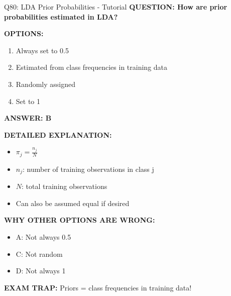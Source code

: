\documentclass[8pt]{beamer}
\begin{document}
	\begin{frame}{Q80: LDA Prior Probabilities - Tutorial}
		\fontsize{6.5}{7.5}\selectfont
		\textbf{QUESTION: How are prior probabilities estimated in LDA?}
		
		\vspace{0.1cm}
		\textbf{OPTIONS:}
		\begin{enumerate}
			\item Always set to 0.5
			\item Estimated from class frequencies in training data
			\item Randomly assigned
			\item Set to 1
		\end{enumerate}
		
		\vspace{0.1cm}
		\textcolor{myblue}{\textbf{ANSWER: B}}
		
		\vspace{0.1cm}
		\textbf{DETAILED EXPLANATION:}
		\begin{itemize}
			\item $\pi_j = \frac{n_j}{N}$
			\item $n_j$: number of training observations in class j
			\item $N$: total training observations
			\item Can also be assumed equal if desired
		\end{itemize}
		
		\vspace{0.1cm}
		\textcolor{myred}{\textbf{WHY OTHER OPTIONS ARE WRONG:}}
		\begin{itemize}
			\item \textcolor{myred}{A:} Not always 0.5
			\item \textcolor{myred}{C:} Not random
			\item \textcolor{myred}{D:} Not always 1
		\end{itemize}
		
		\textcolor{myred}{\textbf{EXAM TRAP:}} Priors = \textcolor{myblue}{class frequencies} in training data!
	\end{frame}
	
\end{document}
